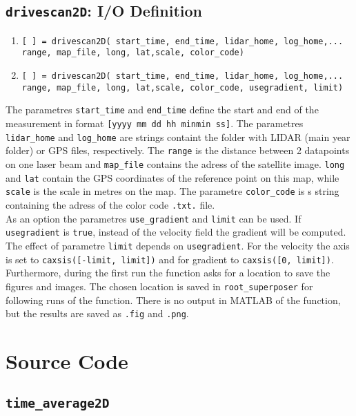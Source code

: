 \documentclass[
12pt,
a4paper,
twoside]
{article}
\begin{document}
\subsection{\texttt{drivescan2D}: I/O Definition}
\begin{enumerate}
\item \verb![ ] = drivescan2D( start_time, end_time, lidar_home, log_home,...!\\
\verb!range, map_file, long, lat,scale, color_code)!
\item \verb![ ] = drivescan2D( start_time, end_time, lidar_home, log_home,...!\\
\verb!range, map_file, long, lat,scale, color_code, usegradient, limit)!
\end{enumerate}
The parametres \verb!start_time! and \verb!end_time! define the start and end of the measurement in format \verb![yyyy mm dd hh minmin ss]!. The parametres \verb!lidar_home! and \verb!log_home! are strings containt the folder with LIDAR (main year folder) or GPS files, respectively. The \verb!range! is the distance between 2 datapoints on one laser beam and \verb!map_file! contains the adress of the satellite image. \verb!long! and \verb!lat! contain the GPS coordinates of the reference point on this map, while \verb!scale! is the scale in metres on the map. The parametre \verb!color_code! is s string containing the adress of the color code \verb!.txt.! file.\\
As an option the parametres \verb!use_gradient! and \verb!limit! can be used. If \verb!usegradient! is \verb!true!, instead of the velocity field the gradient will be computed. The effect of parametre \verb!limit! depends on \verb!usegradient!. For the velocity the axis is set to \verb!caxsis([-limit, limit])! and for gradient to \verb!caxsis([0, limit])!.\\
Furthermore, during the first run the function asks for a location to save the figures and images. The chosen location is saved in \verb!root_superposer! for following runs of the function. There is no output in MATLAB of the function, but the results are saved as \verb!.fig! and \verb!.png!.

\newpage
\section{Source Code}
\subsection{\texttt{time\_{}average2D}}

\end{document}
